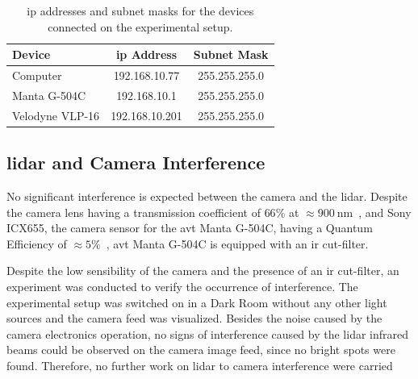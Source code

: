 \begin{table}[!ht]
	\renewcommand{\arraystretch}{1.2}
	\centering
	\begin{tabular}{@{}lcc@{}}
		\toprule
		Device          & \ac{ip} Address & Subnet Mask\\ \midrule
		Computer        & 192.168.10.77  & 255.255.255.0 \\
		Manta G-504C    & 192.168.10.1   & 255.255.255.0 \\
		Velodyne VLP-16 & 192.168.10.201 & 255.255.255.0 \\
		\bottomrule
	\end{tabular}
	\caption[\acs{ip} addresses and subnet masks for the devices connected on the experimental setup.]{\ac{ip} addresses and subnet masks for the devices connected on the experimental setup.}
	\label{tab:experimental-setup-ip}
\end{table}

\subsection{\acs{lidar} and Camera Interference}
No significant interference is expected between the camera and the \ac{lidar}. Despite the camera lens having a transmission coefficient of $66\%$ at $\approx \SI{900}{\nano\meter}$~\cite{Thorlabs}, and Sony ICX655, the camera sensor for the \ac{avt} Manta G-504C, having a Quantum Efficiency of $\approx 5\%$~\cite{MantaG504C}, \ac{avt} Manta G-504C is equipped with an \ac{ir} cut-filter.

Despite the low sensibility of the camera and the presence of an \ac{ir} cut-filter, an experiment was conducted to verify the occurrence of interference. The experimental setup was switched on in a Dark Room without any other light sources and the camera feed was visualized. Besides the noise caused by the camera electronics operation, no signs of interference caused by the \ac{lidar} infrared beams could be observed on the camera image feed, since no bright spots were found. Therefore, no further work on \ac{lidar} to camera interference were carried





